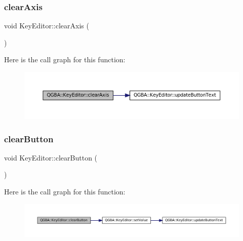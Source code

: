 \subsubsection{\texorpdfstring{clear\+Axis}{clearAxis}}
{\footnotesize\ttfamily void Key\+Editor\+::clear\+Axis (\begin{DoxyParamCaption}{ }\end{DoxyParamCaption})\hspace{0.3cm}{\ttfamily [slot]}}

Here is the call graph for this function\+:
\nopagebreak
\begin{figure}[H]
\begin{center}
\leavevmode
\includegraphics[width=350pt]{class_q_g_b_a_1_1_key_editor_ad813791e61eec2df461175cdf042418b_cgraph}
\end{center}
\end{figure}
\mbox{\label{class_q_g_b_a_1_1_key_editor_acc1599328743f8611ca030571cb0c96a}} 
\subsubsection{\texorpdfstring{clear\+Button}{clearButton}}
{\footnotesize\ttfamily void Key\+Editor\+::clear\+Button (\begin{DoxyParamCaption}{ }\end{DoxyParamCaption})\hspace{0.3cm}{\ttfamily [slot]}}

Here is the call graph for this function\+:
\nopagebreak
\begin{figure}[H]
\begin{center}
\leavevmode
\includegraphics[width=350pt]{class_q_g_b_a_1_1_key_editor_acc1599328743f8611ca030571cb0c96a_cgraph}
\end{center}
\end{figure}
\mbox{\label{class_q_g_b_a_1_1_key_editor_ab9b54608647abd9e963cf725910d6038}} 
